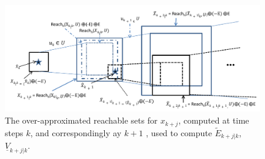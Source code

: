 %
%
%
%
%
%
%



\begin{figure}
\includegraphics[scale=0.75]{figs/OverReachFigure_NL_scissored.pdf}
\caption{The over-approximated reachable sets for $x_{k+j}$, computed at time steps $k$, and correspondingly ay $k+1$ , used to compute $\tilde{E}_{k+j|k}$, $\underline{V}_{k+j|k}$. }
\label{fig:overreach_NL}
\end{figure}